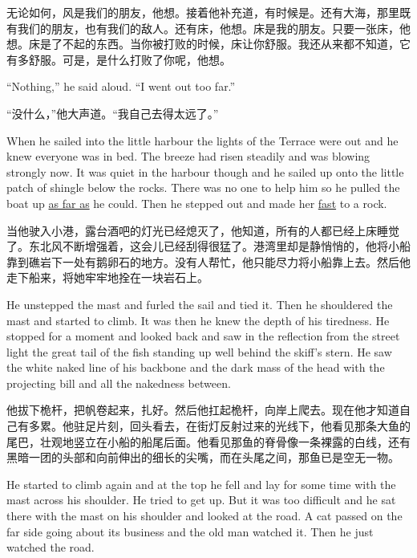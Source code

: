 \begin{paracol}{2}
\switchcolumn

无论如何，风是我们的朋友，他想。接着他补充道，有时候是。还有大海，那里既有我们的朋友，也有我们的敌人。还有床，他想。床是我的朋友。只要一张床，他想。床是了不起的东西。当你被打败的时候，床让你舒服。我还从来都不知道，它有多舒服。可是，是什么打败了你呢，他想。

\switchcolumn*

``Nothing,'' he said aloud. ``I went out too far.''

\switchcolumn

“没什么，”他大声道。“我自己去得太远了。”

\switchcolumn*

When he sailed into the little harbour the lights of the Terrace were out
and he knew everyone was in bed. The breeze had risen steadily and was
blowing strongly now. It was quiet in the harbour though and he sailed up
onto the little patch of \gls{shingle} below the \glspl{rock}. There was no
one to help him so he pulled the boat up \uline{as far as} he could. Then he stepped
out and made her \uline{fast} to a rock.

\switchcolumn

当他驶入小港，露台酒吧的灯光已经熄灭了，他知道，所有的人都已经上床睡觉了。东北风不断增强着，这会儿已经刮得很猛了。港湾里却是静悄悄的，他将小船靠到礁岩下一处有鹅卵石的地方。没有人帮忙，他只能尽力将小船靠上去。然后他走下船来，将她牢牢地拴在一块岩石上。

\switchcolumn*

He unstepped the mast and furled the sail and tied it. Then he shouldered
the mast and started to climb. It was then he knew the depth of his
\gls{tiredness}. He stopped for a moment and looked back and saw in the
reflection from the street light the great tail of the fish standing up well
behind the skiff's stern. He saw the white naked line of his backbone and
the dark mass of the head with the projecting bill and all the
\gls{nakedness} between.

\switchcolumn

他拔下桅杆，把帆卷起来，扎好。然后他扛起桅杆，向岸上爬去。现在他才知道自己有多累。他驻足片刻，回头看去，在街灯反射过来的光线下，他看见那条大鱼的尾巴，壮观地竖立在小船的船尾后面。他看见那鱼的脊骨像一条裸露的白线，还有黑暗一团的头部和向前伸出的细长的尖嘴，而在头尾之间，那鱼已是空无一物。

\switchcolumn*

He started to climb again and at the top he fell and lay for some time with
the mast across his shoulder. He tried to get up. But it was too difficult
and he sat there with the mast on his shoulder and looked at the road. A
cat passed on the far side going about its business and the old man watched
it. Then he just watched the road.


\end{paracol}
